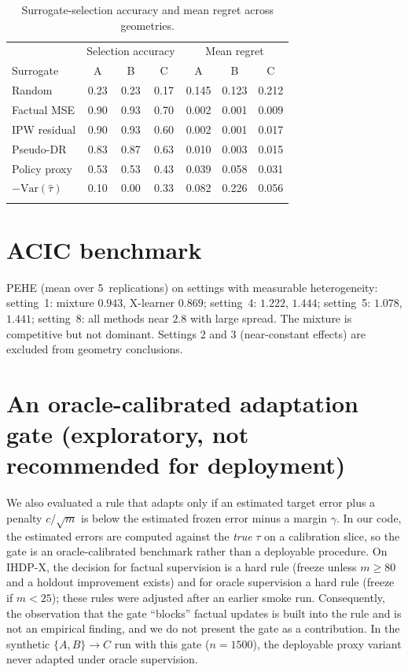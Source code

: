 \documentclass[pdflatex,sn-mathphys-num]{sn-jnl}
\begin{document}
\begin{appendices}
\begin{table}[htbp]
\centering
\caption{Surrogate-selection accuracy and mean regret across geometries.}
\label{tab:surrogate_selection}
\begin{tabular}{@{}lcccccc@{}}
\toprule
 & \multicolumn{3}{c}{Selection accuracy} & \multicolumn{3}{c}{Mean regret}\\
Surrogate & A & B & C & A & B & C\\
\midrule
Random & 0.23 & 0.23 & 0.17 & 0.145 & 0.123 & 0.212\\
Factual MSE & 0.90 & 0.93 & 0.70 & 0.002 & 0.001 & 0.009\\
IPW residual & 0.90 & 0.93 & 0.60 & 0.002 & 0.001 & 0.017\\
Pseudo-DR & 0.83 & 0.87 & 0.63 & 0.010 & 0.003 & 0.015\\
Policy proxy & 0.53 & 0.53 & 0.43 & 0.039 & 0.058 & 0.031\\
$-\mathrm{Var}(\hat\tau)$ & 0.10 & 0.00 & 0.33 & 0.082 & 0.226 & 0.056\\
\botrule
\end{tabular}
\end{table}

\section{ACIC benchmark}
\label{app:acic}
PEHE (mean over 5~replications) on settings with measurable heterogeneity: setting~1: mixture $0.943$, X-learner $0.869$; setting~4: $1.222$, $1.444$; setting~5: $1.078$, $1.441$; setting~8: all methods near $2.8$ with large spread. The mixture is competitive but not dominant. Settings 2 and 3 (near-constant effects) are excluded from geometry conclusions.

\section{An oracle-calibrated adaptation gate (exploratory, not recommended for deployment)}
\label{app:gate}
We also evaluated a rule that adapts only if an estimated target error plus a penalty $c/\sqrt m$ is below the estimated frozen error minus a margin $\gamma$. In our code, the estimated errors are computed against the \emph{true} $\tau$ on a calibration slice, so the gate is an oracle-calibrated benchmark rather than a deployable procedure. On IHDP-X, the decision for factual supervision is a hard rule (freeze unless $m\ge 80$ and a holdout improvement exists) and for oracle supervision a hard rule (freeze if $m<25$); these rules were adjusted after an earlier smoke run. Consequently, the observation that the gate ``blocks'' factual updates is built into the rule and is not an empirical finding, and we do not present the gate as a contribution. In the synthetic $\{A,B\}\to C$ run with this gate ($n=1500$), the deployable proxy variant never adapted under oracle supervision.


\end{appendices}
\end{document}
